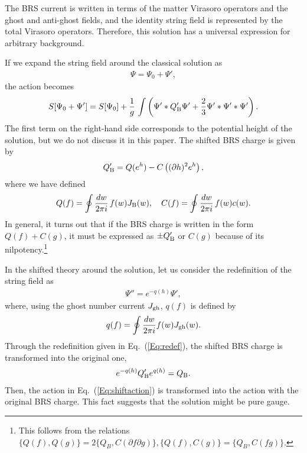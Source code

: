 \documentclass[a4paper,seceq,preprint]{ptptex}
\newcommand{\dz}[1]{\frac{d #1}{2\pi i}}
\newcommand{\Q}{Q_{\rm B}}
\begin{document}
The BRS current is written in terms of  the matter Virasoro operators and the
ghost and anti-ghost fields, and the identity string field is
represented by the total Virasoro operators.\cite{rf:RZ}
Therefore, this  solution has a universal expression for arbitrary
background.

If we expand the string field around the classical solution as
\begin{eqnarray}
 \Psi=\Psi_0 + \Psi',
\end{eqnarray}
the action becomes
\begin{eqnarray}
\label{Eq:shiftaction}
 S[\Psi_0+\Psi'] = S[\Psi_0] +
 \frac{1}{g}\,\int \left( \Psi'*\Q' \Psi' 
+ \frac{2}{3}\Psi'*\Psi'*\Psi'\right).
\end{eqnarray}
The first term on the right-hand side corresponds to the potential
height of the solution, but we do not discuss it in this paper.
The shifted BRS charge is given by
\begin{eqnarray}
\label{Eq:Qh}
 \Q' = Q(e^h) -C\left((\partial h)^2 e^h\right),
\end{eqnarray}
where we have defined
\begin{eqnarray}
 Q(f) = \oint \dz{w}\,f(w) J_{\rm B}(w),\ \ \ 
 C(f) = \oint \dz{w}\,f(w) c(w).
\end{eqnarray}
In general, it turns out that if the BRS charge is written in the form
 $Q(f)+C(g)$, it must be expressed as $\pm \Q'$
or $C(g)$ because of its nilpotency.\footnote{
This follows from the relations $\{Q(f),Q(g)\}=2\{Q_B,C(\partial f\partial g)\},\{Q(f),C(g)\}=\{Q_B,C(fg)\}.$
}

In the shifted theory around the solution, let us consider the
redefinition of the string field as 
\begin{eqnarray}
\label{Eq:redef}
 \Psi'' = e^{-q(h)} \Psi',
\end{eqnarray}
where, using the ghost number current $J_{\rm gh}$,
$q(f)$ is defined by
\begin{eqnarray}
 q(f) = \oint \dz{w} f(w) J_{\rm gh}(w).
\end{eqnarray}
Through the redefinition given in Eq.~(\ref{Eq:redef}), the shifted BRS charge is transformed into the
original one,
\begin{eqnarray}
 e^{-q(h)}\Q' e^{q(h)} = \Q.
\end{eqnarray}
Then, the action in Eq.~(\ref{Eq:shiftaction}) is transformed into the
action with the original BRS charge.
This fact suggests that the solution might be pure gauge.
\end{document}
